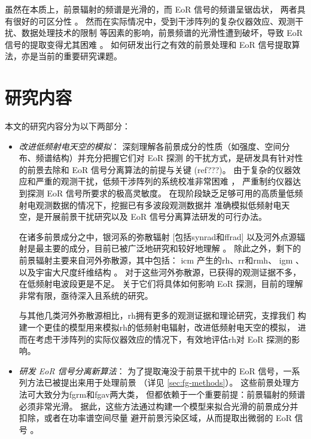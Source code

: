 虽然在本质上，前景辐射的频谱是光滑的，而 EoR 信号的频谱呈锯齿状，
两者具有很好的可区分性 \cite{wang2006,jelic2008,harker2009,wang2013}。
然而在实际情况中，受到干涉阵列的复杂仪器效应、观测干扰、数据处理技术的限制
等因素的影响，前景频谱的光滑性遭到破坏，导致 EoR 信号的提取变得尤其困难
\cite{liu2009ps,labropoulos2009,gehlot2018,mertens2018}。
如何研发出行之有效的前景处理和 EoR 信号提取算法，亦是当前的重要研究课题。


\section{研究内容}
\label{sec:content}

本文的研究内容分为以下两部分：
\begin{itemize}
\item
\emph{改进低频射电天空的模拟}：
深刻理解各前景成分的性质（如强度、空间分布、频谱结构）并充分把握它们对 EoR 探测
的干扰方式，是研发具有针对性的前景去除和 EoR 信号分离算法的前提与关键 (ref???)。
由于复杂的仪器效应和严重的观测干扰，低频干涉阵列的系统校准非常困难
\cite{noordam2004,intema2009,wijnholds2010,barry2016,gehlot2018}，
严重制约仪器达到探测 EoR 信号所要求的极高灵敏度。
在现阶段缺乏足够可用的高质量低频射电观测数据的情况下，挖掘已有多波段观测数据并
准确模拟低频射电天空，是开展前景干扰研究以及 EoR 信号分离算法研发的可行办法。

\hspace{2\ccwd}%
在诸多前景成分之中，银河系的弥散辐射 [包括\ac{synrad}和\ac{ffrad}]
以及河外点源辐射是最主要的成分，目前已被广泛地研究和较好地理解
\cite{shaver1999,diMatteo2004,gleser2008,liu2012,murray2017,spinelli2018}。
除此之外，剩下的前景辐射主要来自河外弥散源，其中包括：
\ac{icm} \cite{feretti2012rev} 产生的\ac{rh}、\ac{rr}和\ac{rmh}、
\ac{igm} \cite{keshet2004}、以及宇宙大尺度纤维结构 \cite{vazza2015}。
对于这些河外弥散源，已获得的观测证据不多，在低频射电波段更是不足。
关于它们将具体如何影响 EoR 探测，目前的理解非常有限，亟待深入且系统的研究。

\hspace{2\ccwd}%
与其他几类河外弥散源相比，\acl{rh}拥有更多的观测证据和理论研究，支撑我们
构建一个更佳的模型用来模拟\acl{rh}的低频射电辐射，改进低频射电天空的模拟，
进而在考虑干涉阵列的实际仪器效应的情况下，有效地评估\acl{rh}对 EoR 探测的影响。

\item
\emph{研发 EoR 信号分离新算法}：
为了提取淹没于前景干扰中的 EoR 信号，一系列方法已被提出来用于处理前景
（详见 \autoref{sec:fg-methods}）。
这些前景处理方法可大致分为\ac{fgrm}和\ac{fgav}两大类，
但都依赖于一个重要前提：前景辐射的频谱必须非常光滑。
据此，这些方法通过构建一个模型来拟合光滑的前景成分并扣除，或者在功率谱空间尽量
避开前景污染区域，从而提取出微弱的 EoR 信号 \cite{chapman2016}。


\end{itemize}
